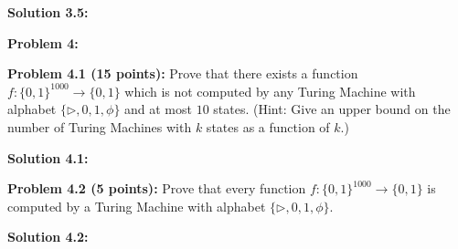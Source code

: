 \documentclass[11pt]{article}
\begin{document}
\textbf{Solution 3.5:} 

\textbf{Problem 4:} 

\textbf{Problem 4.1 (15 points):} Prove that there exists a function $f: \{0,1\}^{1000} \to \{0,1\}$ which is not computed by any Turing Machine with alphabet $\{\triangleright, 0,1,\phi\}$ and at most $10$ states. (Hint: Give an upper bound on the number of Turing Machines with $k$ states as a function of $k$.)

\textbf{Solution 4.1:} 

\textbf{Problem 4.2 (5 points):} Prove that every function $f: \{0,1\}^{1000} \to \{0,1\}$ is computed by a Turing Machine with alphabet $\{\triangleright, 0,1,\phi\}$.

\textbf{Solution 4.2:} 
\end{document}
